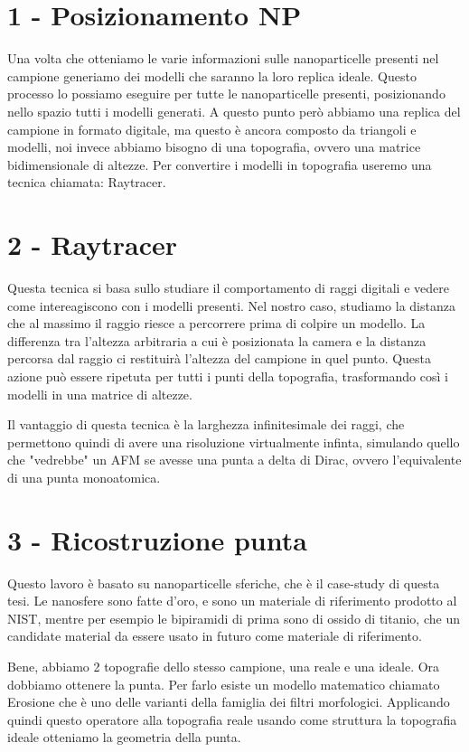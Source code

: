 \documentclass[12pt]{report}
\begin{document}
\section{1 - Posizionamento NP}

Una volta che otteniamo le varie informazioni sulle nanoparticelle presenti nel campione generiamo dei modelli che saranno la loro replica ideale. Questo processo lo possiamo eseguire per tutte le nanoparticelle presenti, posizionando nello spazio tutti i modelli generati. A questo punto però abbiamo una replica del campione in formato digitale, ma questo è ancora composto da triangoli e modelli, noi invece abbiamo bisogno di una topografia, ovvero una matrice bidimensionale di altezze. Per convertire i modelli in topografia useremo una tecnica chiamata: Raytracer.

\section{2 - Raytracer}

Questa tecnica si basa sullo studiare il comportamento di raggi digitali e vedere come intereagiscono con i modelli presenti. Nel nostro caso, studiamo la distanza che al massimo il raggio riesce a percorrere prima di colpire un modello. La differenza tra l'altezza arbitraria a cui è posizionata la camera e la distanza percorsa dal raggio ci restituirà l'altezza del campione in quel punto. Questa azione può essere ripetuta per tutti i punti della topografia, trasformando così i modelli in una matrice di altezze.

Il vantaggio di questa tecnica è la larghezza infinitesimale dei raggi, che permettono quindi di avere una risoluzione virtualmente infinta, simulando quello che "vedrebbe" un AFM se avesse una punta a delta di Dirac, ovvero l'equivalente di una punta monoatomica.

\section{3 - Ricostruzione punta}

Questo lavoro è basato su nanoparticelle sferiche, che è il case-study di questa tesi. Le nanosfere sono fatte d'oro, e sono un materiale di riferimento prodotto al NIST, mentre per esempio le bipiramidi di prima sono di ossido di titanio, che un candidate material da essere usato in futuro come materiale di riferimento. 

Bene, abbiamo 2 topografie dello stesso campione, una reale e una ideale. Ora dobbiamo ottenere la punta. Per farlo esiste un modello matematico chiamato Erosione che è uno delle varianti della famiglia dei filtri morfologici. Applicando quindi questo operatore alla topografia reale usando come struttura la topografia ideale otteniamo la geometria della punta.
\end{document}
